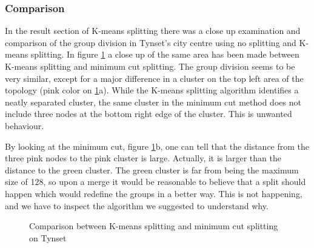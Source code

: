 \subsubsection{Comparison}
In the result section of K-means splitting there was a close up examination and comparison of the group division in Tynset's city centre using no splitting and K-means splitting.
In figure \ref{fig:mincutcomparison} a close up of the same area has been made between K-means splitting and minimum cut splitting. The group division seems to 
be very similar, except for a major difference in a cluster on the top left area of the topology (pink color on \ref{fig:mincutcomparison}a).
While the K-means splitting algorithm identifies a neatly separated cluster, the same cluster in the minimum cut method does not include three nodes at the bottom right edge of the cluster.
This is unwanted behaviour. 

By looking at the minimum cut, figure \ref{fig:mincutcomparison}b, one can tell that the distance from the three pink nodes to the pink cluster is large.
Actually, it is larger than the distance to the green cluster. The green cluster is far from being the maximum size of 128, so upon a merge it would be reasonable to believe
that a split should happen which would redefine the groups in a better way. This is not happening, and we have to inspect the algorithm we suggested to understand why. 
\begin{figure}
	\centering
		\qquad
		\caption{Comparison between K-means splitting and minimum cut splitting on Tynset}%
		\label{fig:mincutcomparison}%
\end{figure}



